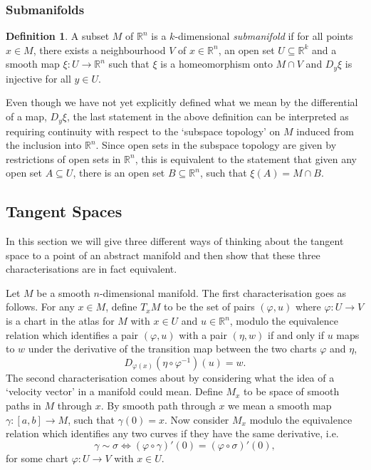 \documentclass[12pt,a4paper]{article}
\numberwithin{equation}{section}
\theoremstyle{definition}
\newtheorem{definition}{Definition}[section]
\theoremstyle{remark}
\begin{document}
\subsubsection{Submanifolds}
\begin{definition}
A subset $M$ of $\mathbb{R}^n$ is a $k$-dimensional \textit{submanifold} if for all points $x\in M$, there exists a neighbourhood $V$ of $x\in\mathbb{R}^n$, an open set $U\subseteq\mathbb{R}^k$ and a smooth map $\xi:U\to\mathbb{R}^n$ such that $\xi$ is a homeomorphism onto $M\cap V$ and $D_y\xi$ is injective for all $y\in U$. 
\end{definition}
Even though we have not yet explicitly defined what we mean by the differential of a map, $D_y\xi$, the last statement in the above definition can be interpreted as requiring continuity with respect to the `subspace topology' on $M$ induced from the inclusion into $\mathbb{R}^n$. Since open sets in the subspace topology are given by restrictions of open sets in $\mathbb{R}^n$, this is equivalent to the statement that given any open set $A\subseteq U$, there is an open set $B\subseteq\mathbb{R}^n$, such that $\xi(A)=M\cap B$.
\subsection{Tangent Spaces}

In this section we will give three different ways of thinking about the tangent space to a point of an abstract manifold and then show that these three characterisations are in fact equivalent.

Let $M$ be a smooth $n$-dimensional manifold. The first characterisation goes as follows. For any $x\in M$, define $T_xM$ to be the set of pairs $(\varphi,u)$ where $\varphi:U\to V$ is a chart in the atlas for $M$ with $x\in U$ and $u\in\mathbb{R}^n$, modulo the equivalence relation which identifies a pair $(\varphi,u)$ with a pair $(\eta,w)$ if and only if $u$ maps to $w$ under the derivative of the transition map between the two charts $\varphi$ and $\eta$,
\[
D_{\varphi(x)}(\eta\circ\varphi^{-1})(u)=w.
\]
The second characterisation comes about by considering what the idea of a `velocity vector' in a manifold could mean. Define $M_x$ to be space of smooth paths in $M$ through $x$. By smooth path through $x$ we mean a smooth map $\gamma:[a,b]\to M$, such that $\gamma(0)=x$. Now consider $M_x$ modulo the equivalence relation which identifies any two curves if they have the same derivative, i.e. 
\[
\gamma\sim\sigma\Leftrightarrow(\varphi\circ\gamma)'(0)=(\varphi\circ\sigma)'(0),
\] 
for some chart $\varphi:U\to V$ with $x\in U$. 
\end{document}
